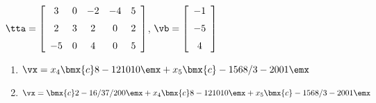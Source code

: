 {$\tta = \left[ \begin {array}{ccccc} 3&0&-2&-4&5\\\noalign{\medskip}2&3&2&0&2
\\\noalign{\medskip}-5&0&4&0&5\end {array} \right] $, 
$\vb=\left[ \begin {array}{c} -1\\\noalign{\medskip}-5\\\noalign{\medskip}
4\end {array} \right]$}
{\begin{enumerate}
\item	 $\vx=x_4\bmx{c}8\\-12\\10\\1\\0\emx+x_5\bmx{c} -15\\ 68/3 \\-20\\0\\1 \emx$

\item	$\vx=\bmx{c} 2\\ -16/3\\ 7/2 \\ 0\\ 0  \emx + x_4\bmx{c}8\\-12\\10\\1\\0\emx+x_5\bmx{c} -15\\ 68/3 \\-20\\0\\1 \emx$
\end{enumerate}}



